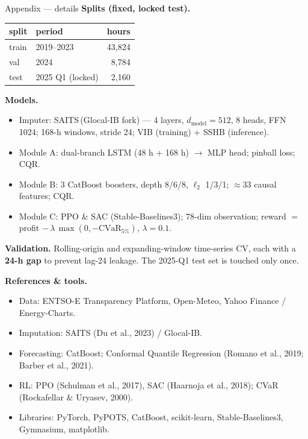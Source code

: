 \documentclass[aspectratio=169,11pt]{beamer}
\newcommand{\actname}{}
\newcommand{\actcolor}{emisAccent}
\newcommand{\setact}[2]{\renewcommand{\actname}{#1}\renewcommand{\actcolor}{#2}}
\begin{document}
\setact{Appendix}{emisMuted}
\begin{frame}[allowframebreaks]{Appendix --- details}
  \footnotesize
  \textbf{Splits (fixed, locked test).}
  \begin{tabular}{@{}l l r@{}}
    \toprule
    split & period & hours\\\midrule
    train & 2019--2023 & 43{,}824\\
    val   & 2024 & 8{,}784\\
    test  & 2025 Q1 (locked) & 2{,}160\\
    \bottomrule
  \end{tabular}

  \medskip
  \textbf{Models.}
  \begin{itemize}\setlength\itemsep{2pt}
    \item Imputer: SAITS\,(Glocal-IB fork) --- 4 layers, $d_{\text{model}}{=}512$, 8 heads, FFN 1024; 168-h windows, stride 24; VIB (training) + SSHB (inference).
    \item Module A: dual-branch LSTM (48 h + 168 h) $\rightarrow$ MLP head; pinball loss; CQR.
    \item Module B: 3 CatBoost boosters, depth 8/6/8, $\ell_2$ 1/3/1; $\approx$33 causal features; CQR.
    \item Module C: PPO \& SAC (Stable-Baselines3); 78-dim observation; reward $=$ profit $-\,\lambda\,\max(0,-\mathrm{CVaR}_{5\%})$, $\lambda{=}0.1$.
  \end{itemize}

  \medskip
  \textbf{Validation.} Rolling-origin and expanding-window time-series CV, each with a
  \textbf{24-h gap} to prevent lag-24 leakage. The 2025-Q1 test set is touched only once.

  \framebreak
  \textbf{References \& tools.}
  \begin{itemize}\setlength\itemsep{3pt}
    \item Data: ENTSO-E Transparency Platform, Open-Meteo, Yahoo Finance / Energy-Charts.
    \item Imputation: SAITS (Du et al., 2023) / Glocal-IB.
    \item Forecasting: CatBoost; Conformal Quantile Regression (Romano et al., 2019; Barber et al., 2021).
    \item RL: PPO (Schulman et al., 2017), SAC (Haarnoja et al., 2018); CVaR (Rockafellar \& Uryasev, 2000).
    \item Libraries: PyTorch, PyPOTS, CatBoost, scikit-learn, Stable-Baselines3, Gymnasium, matplotlib.
  \end{itemize}
\end{frame}
\end{document}
